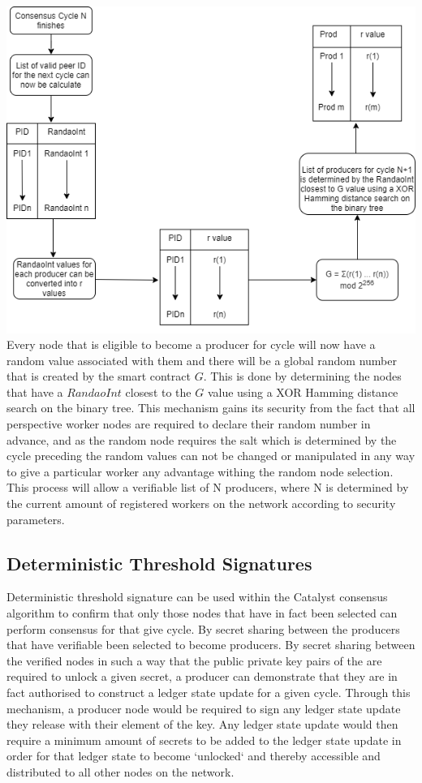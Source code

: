 \includegraphics[scale=.45]{Figures/globalRand.png} \\


Every node that is eligible to become a producer for cycle will now have a random value associated with them and there will be a global random number that is created by the smart contract $G$. This is done by determining the nodes that have a $RandaoInt$ closest to the $G$ value using a XOR Hamming distance search on the binary tree. This mechanism gains its security from the fact that all perspective worker nodes are required to declare their random number in advance, and as the random node requires the salt which is determined by the cycle preceding the random values can not be changed or manipulated in any way to give a particular worker any advantage withing the random node selection. \\

This process will allow a verifiable list of N producers, where N is determined by the current amount of registered workers on the network according to security parameters.  

\subsection{Deterministic Threshold Signatures} 

Deterministic threshold signature can be used within the Catalyst consensus algorithm to confirm that only those nodes that have in fact been selected can perform consensus for that give cycle. By secret sharing between the producers that have verifiable been selected to become producers. By secret sharing between the verified nodes in such a way that the public private key pairs of the are required to unlock a given secret, a producer can demonstrate that they are in fact authorised to construct a ledger state update for a given cycle. Through this mechanism, a producer node would be required to sign any ledger state update they release with their element of the key. Any ledger state update would then require a minimum amount of secrets to be added to the ledger state update in order for that ledger state to become `unlocked` and thereby accessible and distributed to all other nodes on the network. 